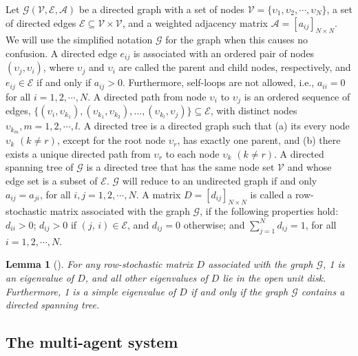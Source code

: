 \documentclass[a4paper,10pt,onecolumn]{article}
\newtheorem{lemma}{Lemma}
\begin{document}
Let $\mathcal{G}(\mathcal{V},\mathcal{E},\mathcal{A})$ be a directed
graph with a set of nodes $\mathcal{V} = \{\upsilon_1, \upsilon_2,
\cdots, \upsilon_N\}$, a set of directed edges $\mathcal{E} \subseteq
\mathcal{V}\times \mathcal{V}$, and a weighted adjacency matrix
$\mathcal{A} = [a_{ij}]_{N\times N}$. We will use the
simplified notation
$\mathcal{G}$ for the graph when this causes no confusion.
A directed edge $e_{ij}$ is associated with an ordered
pair of nodes $(\upsilon_j , \upsilon_i)$, where $\upsilon_j$ and
$\upsilon_i$ are called the parent and child nodes, respectively,
and $e_{ij} \in \mathcal{E}$ if and only if $a_{ij}> 0$. Furthermore,
self-loops are not allowed, i.e.,
$a_{ii}=0$ for all $i=1,2,\cdots,N$. A directed
path from node $\upsilon_i$ to $\upsilon_j$ is an ordered sequence of edges,
$\{(\upsilon_i, \upsilon_{k_1}), (\upsilon_{k_1}, \upsilon_{k_2}),
\ldots, (\upsilon_{k_l}, \upsilon_j)\}\subseteq \mathcal{E}$, with distinct nodes
$\upsilon_{k_m}, m = 1, 2, \cdots, l$.  A directed tree is a directed graph
such that (a)
its every node $\upsilon_{k}$ $(k\neq r)$, except for the root node
$\upsilon_{r}$, has exactly one parent, and (b) there exists a unique
directed path from $\upsilon_{r}$ to each node $\upsilon_{k}$ $(k\neq r)$.
A directed spanning tree of
$\mathcal{G}$ is a directed tree that has the same node set  $\mathcal{V}$
and whose edge set is a subset of $\mathcal{E}$. $\mathcal{G}$ will reduce to an undirected graph  if and only $a_{ij}=a_{ji}$, for all $i,j=1,2,\cdots,N$. A matrix $D=[d_{ij}]_{N\times N}$ is called a row-stochastic
matrix associated with the graph $\mathcal{G}$, if the following properties
hold:
$d_{ii} > 0$; $d_{ij}>0$
if $(j,\, i)\in \mathcal{E}$, and $d_{ij}=0$ otherwise; and
$\sum_{j=1}^{N}d_{ij}=1$, for all $i=1,2,\cdots,N$.

\begin{lemma}[\cite{Ren2005}]\label{LemmaRowSto}
For any row-stochastic matrix $D$ associated with the graph $\mathcal{G}$,
1 is an eigenvalue of $D$, and all other eigenvalues of $D$ lie in the
open unit disk. Furthermore, 1 is a simple eigenvalue of $D$ if and
only if the graph $\mathcal{G}$ contains a directed spanning tree.
\end{lemma}

\subsection{The multi-agent system}
\end{document}
